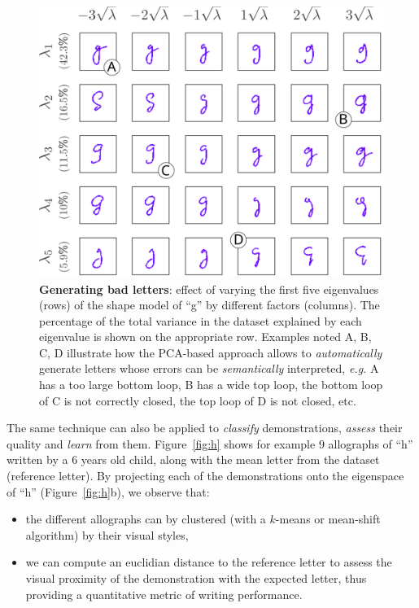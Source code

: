 \documentclass{article}
\newcommand{\eg}{\textit{e.g.}\xspace}
\begin{document}
\begin{figure}
    \centering
    \includegraphics[width=0.9\linewidth]{cowriter-g}
    \caption{\small \label{fig:sampleLetters} \textbf{Generating bad letters}:
        effect of varying the first five eigenvalues (rows) of the shape model
        of ``g'' by different factors (columns). The percentage of the total
        variance in the dataset explained by each eigenvalue is shown      on
        the appropriate row. Examples noted A, B, C, D illustrate how the
        PCA-based approach allows to \emph{automatically} generate letters whose
        errors can be \emph{semantically} interpreted, \eg A has a too large bottom
        loop, B has a wide top loop, the bottom loop of C is not correctly
        closed, the top loop of D is not closed, etc.}

\end{figure}

The same technique can also be applied to \emph{classify} demonstrations,
\emph{assess} their quality and \emph{learn} from them. Figure~\ref{fig:h} shows
for example 9 allographs of ``h'' written by a 6 years old child, along with the
mean letter from the dataset (reference letter). By projecting each of the
demonstrations onto the eigenspace of ``h'' (Figure~\ref{fig:h}b), we observe
that:

\begin{itemize}
    \item the different allographs can by clustered (with a $k$-means or
        mean-shift algorithm) by their visual styles,
    \item we can compute an euclidian distance to the reference letter to assess
        the visual proximity of the demonstration with the expected letter, thus
        providing a quantitative metric of writing performance.
\end{itemize}
\end{document}

